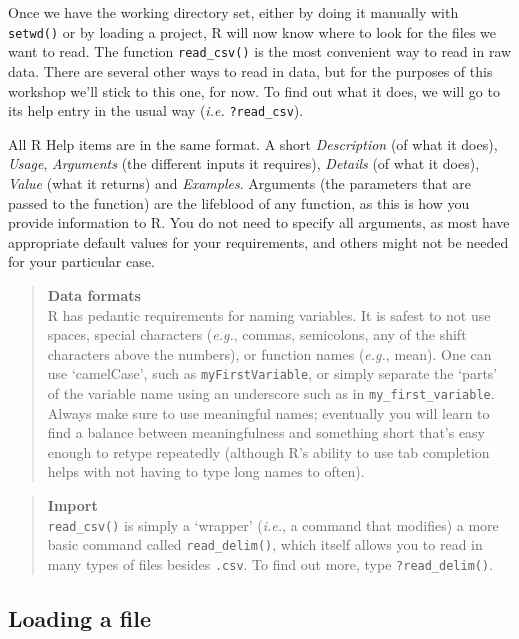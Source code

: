 \documentclass[
]{book}
\begin{document}
Once we have the working directory set, either by doing it manually with \texttt{setwd()} or by loading a project, R will now know where to look for the files we want to read. The function \texttt{read\_csv()} is the most convenient way to read in raw data. There are several other ways to read in data, but for the purposes of this workshop we'll stick to this one, for now. To find out what it does, we will go to its help entry in the usual way (\emph{i.e.} \texttt{?read\_csv}).

All R Help items are in the same format. A short \emph{Description} (of what it does), \emph{Usage}, \emph{Arguments} (the different inputs it requires), \emph{Details} (of what it does), \emph{Value} (what it returns) and \emph{Examples}. Arguments (the parameters that are passed to the function) are the lifeblood of any function, as this is how you provide information to R. You do not need to specify all arguments, as most have appropriate default values for your requirements, and others might not be needed for your particular case.

\begin{quote}
\textbf{Data formats}\\
R has pedantic requirements for naming variables. It is safest to not use spaces, special characters (\emph{e.g.}, commas, semicolons, any of the shift characters above the numbers), or function names (\emph{e.g.}, mean). One can use `camelCase', such as \texttt{myFirstVariable}, or simply separate the `parts' of the variable name using an underscore such as in \texttt{my\_first\_variable}. Always make sure to use meaningful names; eventually you will learn to find a balance between meaningfulness and something short that's easy enough to retype repeatedly (although R's ability to use tab completion helps with not having to type long names to often).
\end{quote}

\begin{quote}
\textbf{Import}\\
\texttt{read\_csv()} is simply a `wrapper' (\emph{i.e.}, a command that modifies) a more basic command called \texttt{read\_delim()}, which itself allows you to read in many types of files besides \texttt{.csv}. To find out more, type \texttt{?read\_delim()}.
\end{quote}

\hypertarget{loading-a-file}{%
\subsection{Loading a file}\label{loading-a-file}}
\end{document}
